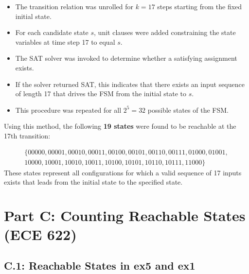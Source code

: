 \documentclass[10pt]{article}
\begin{document}
\begin{itemize}
\item The transition relation was unrolled for $k = 17$ steps starting from the fixed initial state.
\item For each candidate state $s$, unit clauses were added constraining the state variables at time step 17 to equal $s$.
\item The SAT solver was invoked to determine whether a satisfying assignment exists.
\item If the solver returned SAT, this indicates that there exists an input sequence of length 17 that drives the FSM from the initial state to $s$.
\item This procedure was repeated for all $2^5 = 32$ possible states of the FSM.
\end{itemize}

Using this method, the following \textbf{19 states} were found to be reachable at the 17th transition:

\[
\begin{aligned}
\{00000, 00001, 00010, 00011, 00100, 00101, 00110, 00111, 01000, 01001,\\
10000, 10001, 10010, 10011, 10100, 10101, 10110, 10111, 11000\}
\end{aligned}
\]
These states represent all configurations for which a valid sequence of 17 inputs exists that leads from the initial state to the specified state.

\section{Part C: Counting Reachable States (ECE 622)}

\subsection*{C.1: Reachable States in ex5 and ex1}
\end{document}
